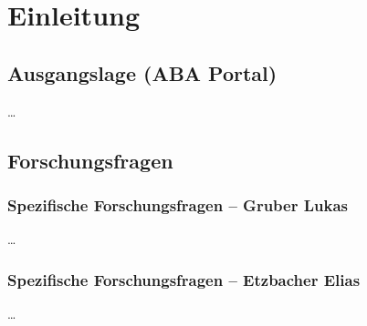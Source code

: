 \chapter{Einleitung}
\section{Ausgangslage (ABA Portal)}
\ldots
\section{Forschungsfragen}
\subsection{Spezifische Forschungsfragen -- Gruber Lukas}
\ldots
\subsection{Spezifische Forschungsfragen -- Etzbacher Elias}
\ldots
